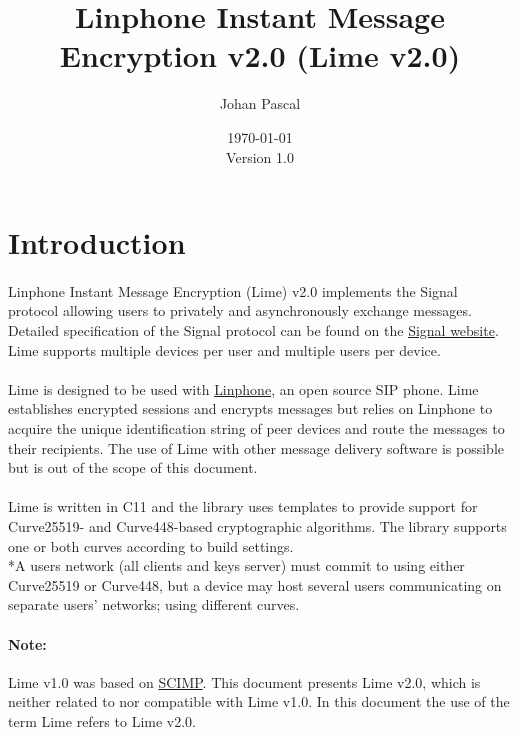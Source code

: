 \documentclass[a4paper,11pt]{article}
\title{Linphone Instant Message Encryption v2.0 (Lime v2.0)}
\date{\today\\Version 1.0}
\author{Johan Pascal}
\begin{document}
\maketitle
\tableofcontents
\newpage

\section{Introduction}
\paragraph{}Linphone Instant Message Encryption (Lime) v2.0 implements the Signal protocol allowing users to privately and asynchronously exchange messages. Detailed specification of the Signal protocol can be found on the \href{https://signal.org/docs/}{Signal website}. Lime supports multiple devices per user and multiple users per device.
\paragraph{}Lime is designed to be used with \href{https://linphone.org}{Linphone}, an open source SIP phone. Lime establishes encrypted sessions and encrypts messages but relies on Linphone to acquire the unique identification string of peer devices and route the messages to their recipients. The use of Lime with other message delivery software is possible but is out of the scope of this document.
\paragraph*{}Lime is written in C\nolinebreak\hspace{-.05em}\raisebox{.4ex}{\tiny\bf +}\nolinebreak\hspace{-.10em}\raisebox{.4ex}{\tiny\bf +}11 and the library uses templates to provide support for Curve25519- and Curve448-based cryptographic algorithms. The library supports one or both curves according to build settings.\\*A users network (all clients and keys server) must commit to using either Curve25519 or Curve448, but a device may host several users communicating on separate users' networks; using different curves.
\paragraph{Note:} Lime v1.0 was based on \href{https://en.wikipedia.org/wiki/Silent_Circle_Instant_Messaging_Protocol}{SCIMP}. This document presents Lime v2.0, which is neither related to nor compatible with Lime v1.0. In this document the use of the term Lime refers to Lime v2.0.
\end{document}
